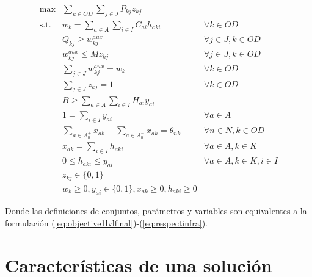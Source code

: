 \documentclass{article}
\begin{document}
  \begin{align}
    \text{max}    & \sum_{k \in OD} \sum_{j \in J} P_{kj} z_{kj}                          & \label{eq:objectivealtfinal} \\
    \text{s.t.}\; & w_k = \sum_{a \in A} \sum_{i \in I} C_{ai}h_{aki}                     & \forall k \in OD \label{eq:shortestpathaltfinal} \\
                  & Q_{kj} \geq w^{aux}_{kj}                                              & \forall j \in J, k \in OD \label{eq:breakpointsalt} \\
                  & w^{aux}_{kj} \leq M z_{kj}                                            & \forall j \in J, k \in OD \\
                  & \sum_{j \in J} w^{aux}_{kj} = w_k                                     & \forall k \in OD \\
                  & \sum_{j \in J} z_{kj} = 1                                             & \forall k \in OD \label{eq:singularbreakpointalt} \\
                  & B \geq \sum_{a \in A} \sum_{i \in I} H_{ai}y_{ai}                     & \label{eq:respectbudgetaltfinal} \\
                  & 1 = \sum_{i \in I} y_{ai}                                             & \forall a \in A \label{eq:alwaysoneyaltfinal} \\
                  & \sum_{a \in A_n^+} x_{ak} - \sum_{a \in A_n^-} x_{ak} = \theta_{nk}   & \forall n \in N, k \in OD \label{eq:flowbalancealtfinal} \\
                  & x_{ak} = \sum_{i \in I} h_{aki}                                       & \forall a \in A, k \in K \label{eq:flowactivationalt} \\
                  & 0 \leq h_{aki} \leq y_{ai}                                            & \forall a \in A, k \in K, i \in I \label{eq:respectinfraalt} \\
                  & z_{kj} \in \{0,1\}                                                    & \nonumber \\
                  & w_k \geq 0, y_{ai} \in \{0,1\}, x_{ak} \geq 0, h_{aki} \geq 0         & \nonumber
  \end{align}

  Donde las definiciones de conjuntos, parámetros y variables son equivalentes a la formulación (\ref{eq:objective1lvlfinal})-(\ref{eq:respectinfra}).

  \section*{Características de una solución}
\end{document}
